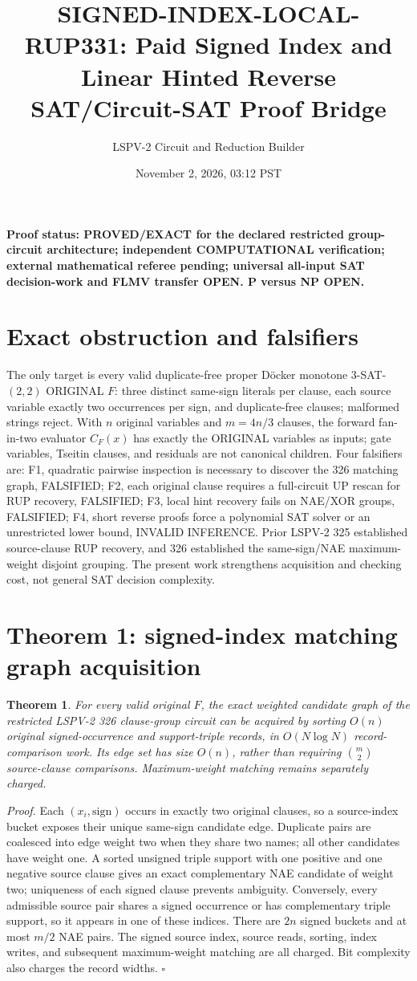 \documentclass[11pt]{article}
\title{SIGNED-INDEX-LOCAL-RUP331: Paid Signed Index and Linear Hinted Reverse SAT/Circuit-SAT Proof Bridge}
\author{LSPV-2 Circuit and Reduction Builder}
\date{November 2, 2026, 03:12 PST}
\newtheorem{theorem}{Theorem}
\begin{document}
\maketitle
\noindent\textbf{Proof status: PROVED/EXACT for the declared restricted group-circuit architecture; independent COMPUTATIONAL verification; external mathematical referee pending; universal all-input SAT decision-work and FLMV transfer OPEN. P versus NP OPEN.}

\section{Exact obstruction and falsifiers}
The only target is every valid duplicate-free proper D\"ocker monotone $3$-SAT-$(2,2)$ ORIGINAL $F$: three distinct same-sign literals per clause, each source variable exactly two occurrences per sign, and duplicate-free clauses; malformed strings reject. With $n$ original variables and $m=4n/3$ clauses, the forward fan-in-two evaluator $C_F(x)$ has exactly the ORIGINAL variables as inputs; gate variables, Tseitin clauses, and residuals are not canonical children. Four falsifiers are: F1, quadratic pairwise inspection is necessary to discover the 326 matching graph, FALSIFIED; F2, each original clause requires a full-circuit UP rescan for RUP recovery, FALSIFIED; F3, local hint recovery fails on NAE/XOR groups, FALSIFIED; F4, short reverse proofs force a polynomial SAT solver or an unrestricted lower bound, INVALID INFERENCE. Prior LSPV-2 325 established source-clause RUP recovery, and 326 established the same-sign/NAE maximum-weight disjoint grouping. The present work strengthens acquisition and checking cost, not general SAT decision complexity.

\section{Theorem 1: signed-index matching graph acquisition}
\begin{theorem}
For every valid original $F$, the exact weighted candidate graph of the restricted LSPV-2 326 clause-group circuit can be acquired by sorting $O(n)$ original signed-occurrence and support-triple records, in $O(N\log N)$ record-comparison work. Its edge set has size $O(n)$, rather than requiring $\binom m2$ source-clause comparisons. Maximum-weight matching remains separately charged.
\end{theorem}
\noindent\textit{Proof.} Each $(x_i,\mathrm{sign})$ occurs in exactly two original clauses, so a source-index bucket exposes their unique same-sign candidate edge. Duplicate pairs are coalesced into edge weight two when they share two names; all other candidates have weight one. A sorted unsigned triple support with one positive and one negative source clause gives an exact complementary NAE candidate of weight two; uniqueness of each signed clause prevents ambiguity. Conversely, every admissible source pair shares a signed occurrence or has complementary triple support, so it appears in one of these indices. There are $2n$ signed buckets and at most $m/2$ NAE pairs. The signed source index, source reads, sorting, index writes, and subsequent maximum-weight matching are all charged. Bit complexity also charges the record widths. \hfill$\square$
\end{document}
